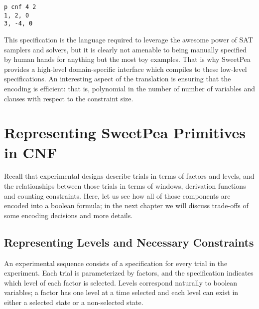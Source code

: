 \begin{verbatim}
p cnf 4 2
1, 2, 0
3, -4, 0
\end{verbatim}


This specification is the language required to leverage the awesome power of SAT samplers and solvers, but it is clearly not amenable to being manually specified by human hands for anything but the most toy examples. That is why SweetPea provides a high-level domain-specific interface which compiles to these low-level specifications. An interesting aspect of the translation is ensuring that the encoding is efficient: that is, polynomial in the number of number of variables and clauses with respect to the constraint size.

\section{Representing SweetPea Primitives in CNF}

Recall that experimental designs describe trials in terms of factors and levels, and the relationships between those trials in terms of windows, derivation functions and counting constraints. Here, let us see how all of those components are encoded into a boolean formula; in the next chapter we will discuss trade-offs of some encoding decisions and more details.

\subsection{Representing Levels and Necessary Constraints}





An experimental sequence consists of a specification for every trial in the experiment. Each trial is parameterized by factors, and the specification indicates which level of each factor is selected. Levels correspond naturally to boolean variables; a factor has one level at a time selected and each level can exist in either a selected state or a non-selected state.

